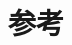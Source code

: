 \documentclass[12pt,a4paper,CJK]{beamer}
\begin{document}
\begin{CJK*}{UTF8}{gkai}
\begin{frame}{\subsecname}
\begin{enumerate}
\begin{displaybox}{115mm}
\end{displaybox}
\end{enumerate}





\end{frame}

\section{参考}
\begin{frame}{\secname}

\nocite{*}




\end{frame}
\end{CJK*}
\end{document}
